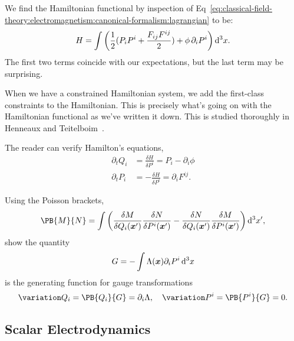 We find the Hamiltonian functional by inspection of
Eq~\eqref{eq:classical-field-theory:electromagnetism:canonical-formalism:lagrangian}
to be:
\begin{equation}
H = \int\left(\frac{1}{2}(P_{i}P^{i}+\frac{F_{ij}F^{ij}}{2}) + \phi\,\partial_{i}P^{i}\right)\mathrm{d}^{3}x.
\end{equation}
The first two terms coincide with our expectations, but the last term
may be surprising.

\begin{ddanger}
When we have a constrained Hamiltonian system, we add the first-class
constraints to the Hamiltonian. This is precisely what's going on with
the Hamiltonian functional as we've written it down. This is studied
thoroughly in Henneaux and Teitelboim~\cite{Henneaux:1992ig}.
\end{ddanger}

\begin{exercise}
The reader can verify Hamilton's equations,
\begin{subequations}
\begin{align}
\partial_{t}Q_{i} &= \frac{\delta H}{\delta P^{i}} = P_{i} - \partial_{i}\phi\\
\partial_{t}P_{i} &= -\frac{\delta H}{\delta P^{i}} = \partial_{i}F^{ij}.
\end{align}
\end{subequations}
\end{exercise}

\begin{exercise}
Using the Poisson brackets,
\begin{equation}
\PB{M}{N} = \int\left(\frac{\delta M}{\delta Q_{i}(\vec{x}')}\frac{\delta N}{\delta P^{i}(\vec{x}')}
-\frac{\delta N}{\delta Q_{i}(\vec{x}')}\frac{\delta M}{\delta P^{i}(\vec{x}')}\right)\D^{3}x',
\end{equation}
show the quantity
\begin{equation}
G = - \int\Lambda(\boldsymbol{x})\partial_{i}P^{i}\,\mathrm{d}^{3}x
\end{equation}
is the generating function for gauge transformations
\begin{equation}
\variation Q_{i}=\PB{Q_{i}}{G}=\partial_{i}\Lambda,\quad
\variation P^{i}=\PB{P^{i}}{G}=0.
\end{equation}
\end{exercise}

\subsection{Scalar Electrodynamics}

